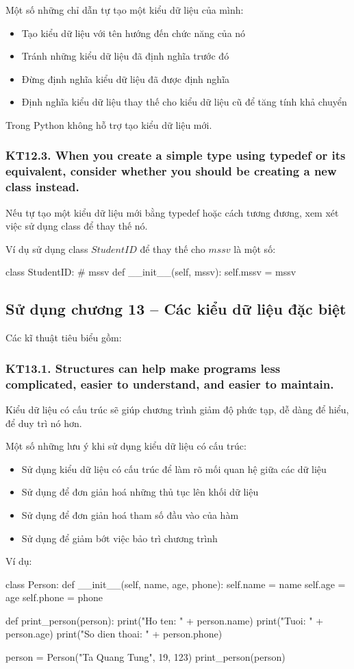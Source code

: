\documentclass[12pt]{report}
\begin{document}
\noindent Một số những chỉ dẫn tự tạo một kiểu dữ liệu của mình: 
\begin{itemize}
	\item Tạo kiểu dữ liệu với tên hướng đến chức năng của nó 
	\item Tránh những kiểu dữ liệu đã định nghĩa trước đó 
	\item Đừng định nghĩa kiểu dữ liệu đã được định nghĩa 
	\item Định nghĩa kiểu dữ liệu thay thế cho kiểu dữ liệu cũ để tăng tính khả chuyển 
\end{itemize}
Trong Python không hỗ trợ tạo kiểu dữ liệu mới. 

\subsubsection{KT12.3. When you create a simple type using typedef or its equivalent, consider whether you should be creating a new class instead.}
Nếu tự tạo một kiểu dữ liệu mới bằng typedef hoặc cách tương đương, xem xét việc sử dụng class để thay thế nó.

Ví dụ sử dụng class $StudentID$ để thay thế cho $mssv$ là một số: 
\begin{python}
class StudentID:
	# mssv
	def __init__(self, mssv):
		self.mssv = mssv
\end{python}

\subsection{Sử dụng chương 13 – Các kiểu dữ liệu đặc biệt}
\noindent Các kĩ thuật tiêu biểu gồm:

\subsubsection{KT13.1. Structures can help make programs less complicated, easier to understand, and easier to maintain.}
Kiểu dữ liệu có cấu trúc sẽ giúp chương trình giảm độ phức tạp, dễ dàng để hiểu, để duy trì nó hơn.
 
\noindent Một số những lưu ý khi sử dụng kiểu dữ liệu có cấu trúc: 
\begin{itemize}
	\item Sử dụng kiểu dữ liệu có cấu trúc để làm rõ mối quan hệ giữa các dữ liệu 
	\item Sử dụng để đơn giản hoá những thủ tục lên khối dữ liệu 
	\item Sử dụng để đơn giản hoá tham số đầu vào của hàm 
	\item Sử dụng để giảm bớt việc bảo trì chương trình
\end{itemize}
Ví dụ:
\begin{python}
class Person:
	def __init__(self, name, age, phone):
		self.name = name
		self.age = age
		self.phone = phone

def print_person(person):
	print("Ho ten: " + person.name)
	print("Tuoi: " + person.age)
	print("So dien thoai: " + person.phone)

person = Person("Ta Quang Tung", 19, 123)
print_person(person)
\end{python}
\end{document}
